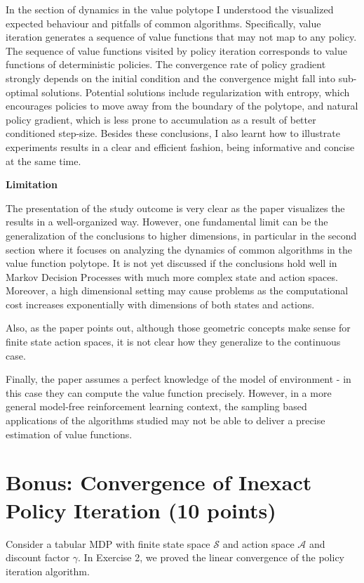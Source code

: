\begin{Solution}
\begin{enumerate} [label=\alph*)]
        In the section of dynamics in the value polytope I understood the visualized expected behaviour and pitfalls of common algorithms. Specifically, value iteration generates a sequence of value functions that may not map to any policy. The sequence of value functions visited by policy iteration corresponds to value functions of deterministic policies. The convergence rate of policy gradient strongly depends on the initial condition and the convergence might fall into sub-optimal solutions. Potential solutions include regularization with entropy, which encourages policies to move away from the boundary of the polytope, and natural policy gradient, which is  less prone to accumulation as a result of better conditioned step-size. Besides these conclusions, I also learnt how to illustrate experiments results in a clear and efficient fashion, being informative and concise at the same time.
        
        \vspace{1em}
        \textbf{Limitation}
        
        The presentation of the study outcome is very clear as the paper visualizes the results in a well-organized way. However, one fundamental limit can be the generalization of the conclusions to higher dimensions, in particular in the second section where it focuses on analyzing the dynamics of common algorithms in the value function polytope. It is not yet discussed if the conclusions hold well in Markov Decision Processes with much more complex state and action spaces. Moreover, a high dimensional setting may cause problems as the computational cost increases exponentially with dimensions of both states and actions.
        
        Also, as the paper points out, although those geometric concepts make sense for finite state action spaces, it is not clear how they generalize to the continuous case.
        
        Finally, the paper assumes a perfect knowledge of the model of environment - in this case they can compute the value function precisely. However, in a more general model-free reinforcement learning context, the sampling based applications of the algorithms studied may not be able to deliver a precise estimation of value functions.
        
\end{enumerate}
\end{Solution}



\clearpage
\section{Bonus: Convergence of Inexact Policy Iteration (10 points)}
Consider a tabular MDP with finite state space $\mathcal{S}$ and action space $\mathcal{A}$ and discount factor $\gamma$. In Exercise 2, we proved the linear convergence of the policy iteration algorithm. \\

